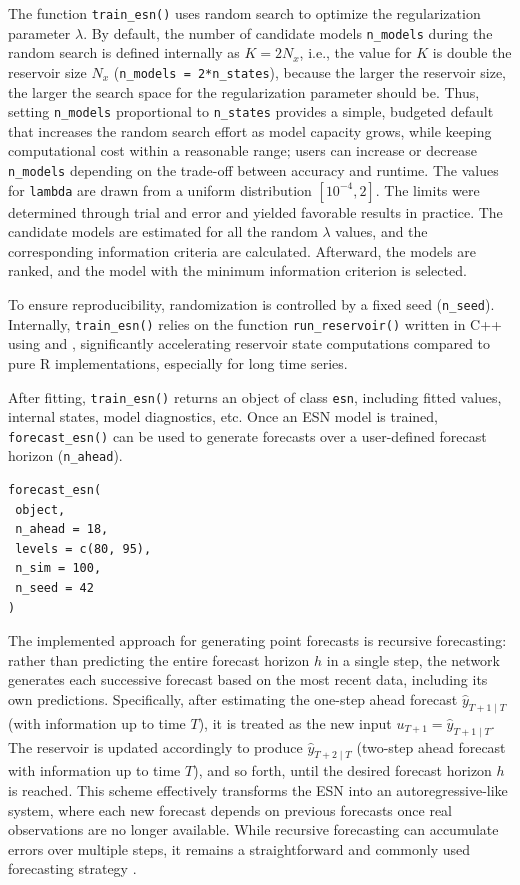 The function \texttt{train\_esn()} uses random search to optimize the regularization parameter \(\lambda\). By default, the number of candidate models \texttt{n\_models} during the random search is defined internally as \(K = 2N_x\), i.e., the value for \(K\) is double the reservoir size \(N_x\) (\texttt{n\_models\ =\ 2*n\_states}), because the larger the reservoir size, the larger the search space for the regularization parameter should be. Thus, setting \texttt{n\_models} proportional to \texttt{n\_states} provides a simple, budgeted default that increases the random search effort as model capacity grows, while keeping computational cost within a reasonable range; users can increase or decrease \texttt{n\_models} depending on the trade-off between accuracy and runtime. The values for \texttt{lambda} are drawn from a uniform distribution \([10^{-4}, 2]\). The limits were determined through trial and error and yielded favorable results in practice. The candidate models are estimated for all the random \(\lambda\) values, and the corresponding information criteria are calculated. Afterward, the models are ranked, and the model with the minimum information criterion is selected.

To ensure reproducibility, randomization is controlled by a fixed seed (\texttt{n\_seed}). Internally, \texttt{train\_esn()} relies on the function \texttt{run\_reservoir()} written in C++ using  \citep{Rcpp} and  \citep{RcppArmadillo}, significantly accelerating reservoir state computations compared to pure R implementations, especially for long time series.

After fitting, \texttt{train\_esn()} returns an object of class \texttt{esn}, including fitted values, internal states, model diagnostics, etc. Once an ESN model is trained, \texttt{forecast\_esn()} can be used to generate forecasts over a user-defined forecast horizon (\texttt{n\_ahead}).

\begin{verbatim}
forecast_esn(
 object, 
 n_ahead = 18,
 levels = c(80, 95),
 n_sim = 100,
 n_seed = 42
)
\end{verbatim}

The implemented approach for generating point forecasts is recursive forecasting: rather than predicting the entire forecast horizon \(h\) in a single step, the network generates each successive forecast based on the most recent data, including its own predictions. Specifically, after estimating the one-step ahead forecast \(\hat{y}_{T+1 \mid T}\) (with information up to time \(T\)), it is treated as the new input \(u_{T+1} = \hat{y}_{T+1 \mid T}\). The reservoir is updated accordingly to produce \(\hat{y}_{T+2 \mid T}\) (two-step ahead forecast with information up to time \(T\)), and so forth, until the desired forecast horizon \(h\) is reached. This scheme effectively transforms the ESN into an autoregressive-like system, where each new forecast depends on previous forecasts once real observations are no longer available. While recursive forecasting can accumulate errors over multiple steps, it remains a straightforward and commonly used forecasting strategy \citep{BenTaieb2014}.

